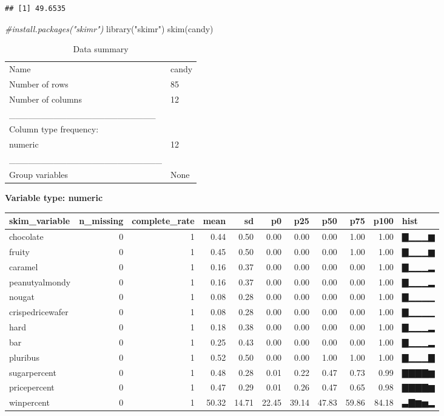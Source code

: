 \documentclass[
]{article}
\newenvironment{Shaded}{\begin{snugshade}}{\end{snugshade}}
\newcommand{\CommentTok}[1]{\textcolor[rgb]{0.56,0.35,0.01}{\textit{#1}}}
\newcommand{\FunctionTok}[1]{\textcolor[rgb]{0.00,0.00,0.00}{#1}}
\newcommand{\NormalTok}[1]{#1}
\newcommand{\StringTok}[1]{\textcolor[rgb]{0.31,0.60,0.02}{#1}}
\begin{document}
\begin{verbatim}
## [1] 49.6535
\end{verbatim}

\begin{Shaded}
\begin{Highlighting}[]
\CommentTok{\#install.packages("skimr")}
\FunctionTok{library}\NormalTok{(}\StringTok{"skimr"}\NormalTok{)}
\FunctionTok{skim}\NormalTok{(candy)}
\end{Highlighting}
\end{Shaded}

\begin{longtable}[]{@{}ll@{}}
\caption{Data summary}\tabularnewline
\toprule
\endhead
Name & candy \\
Number of rows & 85 \\
Number of columns & 12 \\
\_\_\_\_\_\_\_\_\_\_\_\_\_\_\_\_\_\_\_\_\_\_\_ & \\
Column type frequency: & \\
numeric & 12 \\
\_\_\_\_\_\_\_\_\_\_\_\_\_\_\_\_\_\_\_\_\_\_\_\_ & \\
Group variables & None \\
\bottomrule
\end{longtable}

\textbf{Variable type: numeric}

\begin{longtable}[]{@{}lrrrrrrrrrl@{}}
\toprule
skim\_variable & n\_missing & complete\_rate & mean & sd & p0 & p25 &
p50 & p75 & p100 & hist \\
\midrule
\endhead
chocolate & 0 & 1 & 0.44 & 0.50 & 0.00 & 0.00 & 0.00 & 1.00 & 1.00 &
▇▁▁▁▆ \\
fruity & 0 & 1 & 0.45 & 0.50 & 0.00 & 0.00 & 0.00 & 1.00 & 1.00 &
▇▁▁▁▆ \\
caramel & 0 & 1 & 0.16 & 0.37 & 0.00 & 0.00 & 0.00 & 0.00 & 1.00 &
▇▁▁▁▂ \\
peanutyalmondy & 0 & 1 & 0.16 & 0.37 & 0.00 & 0.00 & 0.00 & 0.00 & 1.00
& ▇▁▁▁▂ \\
nougat & 0 & 1 & 0.08 & 0.28 & 0.00 & 0.00 & 0.00 & 0.00 & 1.00 &
▇▁▁▁▁ \\
crispedricewafer & 0 & 1 & 0.08 & 0.28 & 0.00 & 0.00 & 0.00 & 0.00 &
1.00 & ▇▁▁▁▁ \\
hard & 0 & 1 & 0.18 & 0.38 & 0.00 & 0.00 & 0.00 & 0.00 & 1.00 & ▇▁▁▁▂ \\
bar & 0 & 1 & 0.25 & 0.43 & 0.00 & 0.00 & 0.00 & 0.00 & 1.00 & ▇▁▁▁▂ \\
pluribus & 0 & 1 & 0.52 & 0.50 & 0.00 & 0.00 & 1.00 & 1.00 & 1.00 &
▇▁▁▁▇ \\
sugarpercent & 0 & 1 & 0.48 & 0.28 & 0.01 & 0.22 & 0.47 & 0.73 & 0.99 &
▇▇▇▇▆ \\
pricepercent & 0 & 1 & 0.47 & 0.29 & 0.01 & 0.26 & 0.47 & 0.65 & 0.98 &
▇▇▇▇▆ \\
winpercent & 0 & 1 & 50.32 & 14.71 & 22.45 & 39.14 & 47.83 & 59.86 &
84.18 & ▃▇▆▅▂ \\
\bottomrule
\end{longtable}
\end{document}
